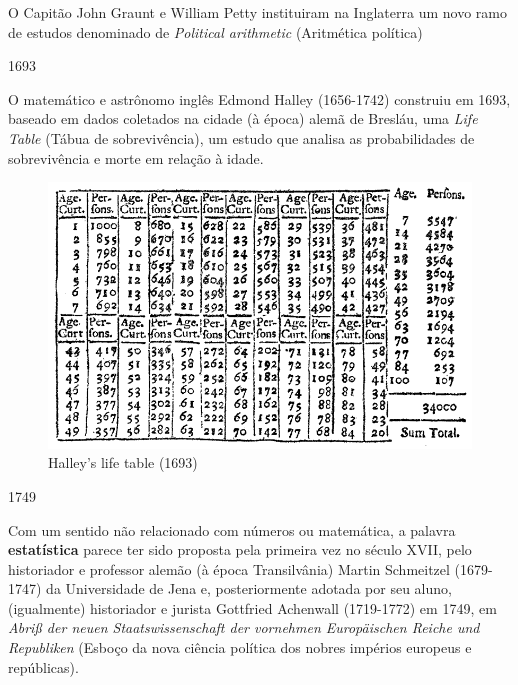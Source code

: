 \documentclass[
]{book}
\begin{document}
\hfill\break

O Capitão John Graunt e William Petty instituiram na Inglaterra um novo ramo de estudos denominado de \emph{Political arithmetic} (Aritmética política)

\hfill\break

1693

\hfill\break

O matemático e astrônomo inglês Edmond Halley (1656-1742) construiu em 1693, baseado em dados coletados na cidade (à época) alemã de Bresláu, uma \emph{Life Table} (Tábua de sobrevivência), um estudo que analisa as probabilidades de sobrevivência e morte em relação à idade.

\hfill\break

\begin{figure}

{\centering \includegraphics[width=0.75\linewidth]{images1/halley} 

}

\caption{Halley’s life table (1693)}\label{fig:unnamed-chunk-6}
\end{figure}

\hfill\break

1749

\hfill\break

Com um sentido não relacionado com números ou matemática, a palavra \textbf{estatística} parece ter sido proposta pela primeira vez no século XVII, pelo historiador e professor alemão (à época Transilvânia) Martin Schmeitzel (1679-1747) da Universidade de Jena e, posteriormente adotada por seu aluno, (igualmente) historiador e jurista Gottfried Achenwall (1719-1772) em 1749, em \emph{Abriß der neuen Staatswissenschaft der vornehmen Europäischen Reiche und Republiken} (Esboço da nova ciência política dos nobres impérios europeus e repúblicas).

\hfill\break
\end{document}
